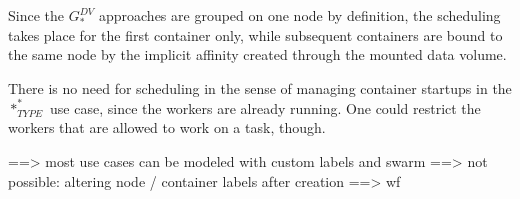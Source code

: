     Since the $G_{*}^{DV}$ approaches are grouped on one node by definition, the scheduling takes place for the first container only, while subsequent containers are bound to the same node by the implicit affinity created through the mounted data volume.

    There is no need for scheduling in the sense of managing container startups in the $*_{TYPE}^{*}$ use case, since the workers are already running. One could restrict the workers that are allowed to work on a task, though.


==> most use cases can be modeled with custom labels and swarm
==> not possible: altering node / container labels after creation
==> wf


